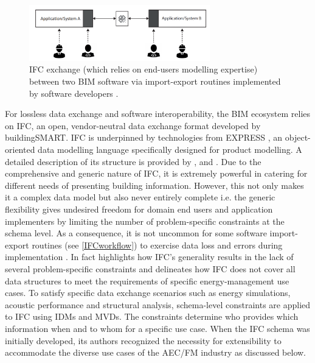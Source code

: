  \begin{figure}[t]
	\centering
	\includegraphics[width=0.7\textwidth]{figures/IFCworkflow}
	\caption{IFC exchange (which relies on end-users modelling expertise) between two BIM software via import-export routines implemented by software developers \citep{Zhang2019}.} 
	\label{IFCworkflow}
\end{figure}
For lossless data exchange and software interoperability, the \ac{BIM} ecosystem relies on \ac{IFC}, an open, vendor-neutral data exchange format developed by buildingSMART. \ac{IFC} is underpinned by technologies from EXPRESS \citep{ISO10303-11.2004}, an object-oriented data modelling language specifically designed for product modelling. A detailed description of its structure is provided by \cite{ISO10303-11.2004}, \cite{ISO10303-212016} and \cite{Pauwels2016}. Due to the comprehensive and generic nature of \ac{IFC}, it is extremely powerful in catering for different needs of presenting building information. However, this not only makes it a complex data model but also never entirely complete i.e. the generic flexibility gives undesired freedom for domain end users and application implementers by limiting the number of problem-specific constraints at the schema level. As a consequence, it is not uncommon for some software import-export routines (see \autoref{IFCworkflow}) to exercise data loss and errors during implementation \citep{Borrmann2010}. In fact \cite{Zhang2015} highlights how \ac{IFC}'s generality results in the lack of several problem-specific constraints and \cite{Msc2016} delineates how \ac{IFC} does not cover all data structures to meet the requirements of specific energy-management use cases. To satisfy specific data exchange scenarios such as energy simulations, acoustic performance and structural analysis, schema-level constraints are applied to \ac{IFC} using \acp{IDM} and \acp{MVD}. The constraints determine who provides which information when and to whom for a specific use case. When the \ac{IFC} schema was initially developed, its authors recognized the necessity for extensibility to accommodate the diverse use cases of the \ac{AEC/FM} industry \citep{Msc2016,Zhang2014} as discussed below. 

